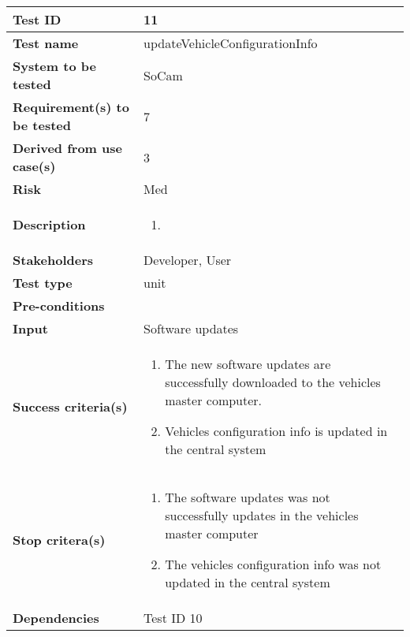 		\begin{table}[H]
			\begin{tabular}{| p{4cm} | p{10cm} |}
			\hline
			\rowcolor{gray}
				{\bf Test ID} & 11 \\ \hline
				{\bf Test name} & updateVehicleConfigurationInfo \\ \hline
				{\bf System to be tested} & SoCam \\ \hline
				{\bf Requirement(s) to be tested} & 7 \\ \hline
				{\bf Derived from use case(s)} & 3 \\ \hline
				{\bf Risk} & Med \\ \hline
				{\bf Description} & 
					\begin{enumerate}
						\item
					\end{enumerate}
				\\ \hline
				{\bf Stakeholders} & Developer, User \\ \hline
				{\bf Test type} & unit \\ \hline
				{\bf Pre-conditions} & \\ \hline
				{\bf Input} & Software updates \\ \hline
				{\bf Success criteria(s)} & 
					\begin{enumerate}
						\item The new software updates are successfully downloaded to
						the vehicles master computer.
						\item Vehicles configuration info is updated in the central system
					\end{enumerate}
				\\ \hline
				{\bf Stop critera(s)} &  
					\begin{enumerate}
						\item The software updates was not successfully updates in the vehicles
						master computer
						\item The vehicles configuration info was not updated in the central system
					\end{enumerate} \\ \hline
				{\bf Dependencies} & Test ID 10 \\ \hline
			\end{tabular}
		\end{table}